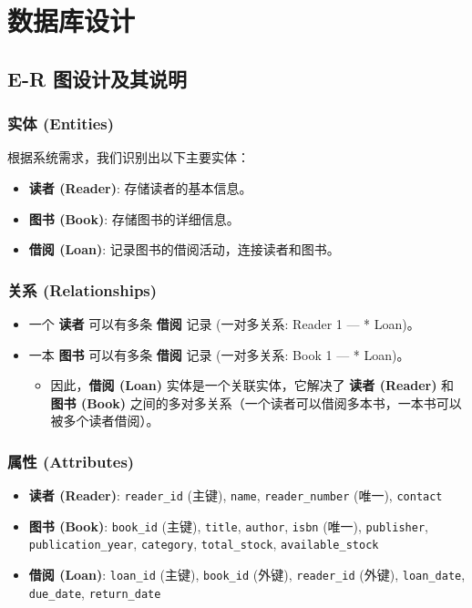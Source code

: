 \documentclass[11pt, a4paper]{article}
\begin{document}
\newpage
\section{数据库设计}

\subsection{E-R 图设计及其说明}
\subsubsection*{实体 (Entities)}
根据系统需求，我们识别出以下主要实体：
\begin{itemize}
    \item \textbf{读者 (Reader)}: 存储读者的基本信息。
    \item \textbf{图书 (Book)}: 存储图书的详细信息。
    \item \textbf{借阅 (Loan)}: 记录图书的借阅活动，连接读者和图书。
\end{itemize}

\subsubsection*{关系 (Relationships)}
\begin{itemize}
    \item 一个 \textbf{读者} 可以有多条 \textbf{借阅} 记录 (一对多关系: Reader 1 --- * Loan)。
    \item 一本 \textbf{图书} 可以有多条 \textbf{借阅} 记录 (一对多关系: Book 1 --- * Loan)。
    \begin{itemize}
        \item 因此，\textbf{借阅 (Loan)} 实体是一个关联实体，它解决了 \textbf{读者 (Reader)} 和 \textbf{图书 (Book)} 之间的多对多关系（一个读者可以借阅多本书，一本书可以被多个读者借阅）。
    \end{itemize}
\end{itemize}

\subsubsection*{属性 (Attributes)}
\begin{itemize}
    \item \textbf{读者 (Reader)}: \texttt{reader\_id} (主键), \texttt{name}, \texttt{reader\_number} (唯一), \texttt{contact}
    \item \textbf{图书 (Book)}: \texttt{book\_id} (主键), \texttt{title}, \texttt{author}, \texttt{isbn} (唯一), \texttt{publisher}, \texttt{publication\_year}, \texttt{category}, \texttt{total\_stock}, \texttt{available\_stock}
    \item \textbf{借阅 (Loan)}: \texttt{loan\_id} (主键), \texttt{book\_id} (外键), \texttt{reader\_id} (外键), \texttt{loan\_date}, \texttt{due\_date}, \texttt{return\_date}
\end{itemize}
\end{document}
